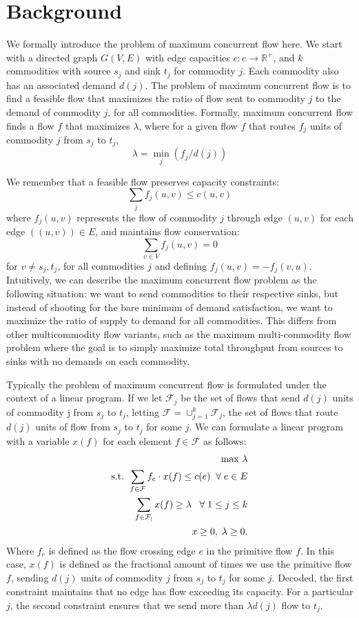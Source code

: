 \section{Background}
We formally introduce the problem of maximum concurrent flow here. We
start with a directed graph $G(V,E)$ with edge capacities 
$c: e \rightarrow \mathbb{R}^+$,
 and $k$ commodities with source $s_j$ and sink $t_j$ for
commodity $j$. Each commodity also has an associated demand
$d(j)$. The problem of maximum concurrent flow is to find a feasible
flow that maximizes the ratio of flow sent to commodity $j$ to the
demand of commodity $j$, for all commodities. Formally, maximum
concurrent flow finds a flow $f$ that maximizes $\lambda$, where for a given flow $f$ that routes $f_j$
units of commodity $j$ from $s_j$ to $t_j$, 
$$\lambda = \min_{j}(f_j/d(j))$$

We remember that a feasible flow preserves capacity constraints: 
$$\sum_j f_j(u,v) \leq c(u,v)$$
where $f_j(u,v)$ represents the flow of commodity $j$ through edge
$(u,v)$ for each edge $((u,v))\in E$, and maintains flow conservation:
$$\sum_{v\in V} f_j(u,v)=0$$ 
for $v\neq s_j,t_j$, for all commodities $j$ and defining
$f_j(u,v)=-f_j(v,u)$. Intuitively, we can describe the maximum
concurrent flow problem as the following situation: we want to send
commodities to their respective sinks, but instead of shooting for the
bare minimum of demand satisfaction, we want to maximize the ratio of
supply to demand for all commodities. This differs from other
multicommodity flow variants, such as the maximum multi-commodity flow
problem where the goal is to simply maximize total throughput from
sources to sinks with no demands on each commodity.

Typically the problem of maximum concurrent flow is formulated under the context of a linear
program. If we let $\mathcal{F}_j$ be the set of flows that send $d(j)$ units
of commodity j from $s_j$ to $t_j$, letting
 $\mathcal{F}=\cup_{j=1}^k \mathcal{F}_j$, the set of flows that route
$d(j)$ units of flow from $s_j$ to $t_j$ for some $j$. We can
formulate a linear program with a variable $x(f)$ for each element
$f\in \mathcal{F}$ as follows:
\begin{align*}
\text{max     } \lambda \\
\text{s.t. }\sum_{f\in \cal{F}}f_e\cdot x(f) \leq c(e) \;\;\forall\;
e\in E \\
\sum_{f\in \cal{F}_j} x(f)\geq \lambda \;\;\;\forall\; 1\leq j\leq k \\
x\geq 0,\; \lambda\geq 0.
\end{align*}
Where $f_e$ is defined as the flow crossing edge $e$ in the primitive
flow $f$. In this case, $x(f)$ is defined as the fractional amount of times we use the
primitive flow $f$, sending $d(j)$ units of commodity $j$ from $s_j$
to $t_j$ for some $j$. Decoded, the first constraint maintains that no
edge has flow exceeding its capacity. For a particular $j$, the second
constraint ensures that we send more than $\lambda d(j)$ flow to
$t_j$. 

